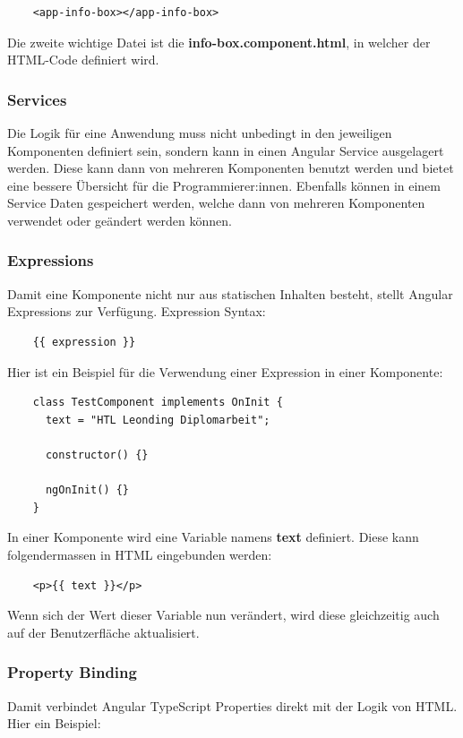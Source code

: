 \begin{lstlisting}
    <app-info-box></app-info-box>
\end{lstlisting}

Die zweite wichtige Datei ist die \textbf{info-box.component.html}, in welcher der HTML-Code definiert wird.

\subsubsection{Services}
Die Logik für eine Anwendung muss nicht unbedingt in den jeweiligen Komponenten definiert sein, sondern kann in einen Angular Service ausgelagert werden. Diese kann dann von mehreren Komponenten benutzt werden und bietet eine bessere Übersicht für die Programmierer:innen.
Ebenfalls können in einem Service Daten gespeichert werden, welche dann von mehreren Komponenten verwendet oder geändert werden können.

\subsubsection{Expressions}
Damit eine Komponente nicht nur aus statischen Inhalten besteht, stellt Angular Expressions zur Verfügung.
Expression Syntax:

\begin{lstlisting}
    {{ expression }}
\end{lstlisting}

Hier ist ein Beispiel für die Verwendung einer Expression in einer Komponente:

\begin{lstlisting}
    class TestComponent implements OnInit {
      text = "HTL Leonding Diplomarbeit";
    
      constructor() {}
    
      ngOnInit() {}
    }
\end{lstlisting}

In einer Komponente wird eine Variable namens \textbf{text} definiert. Diese kann folgendermassen in HTML eingebunden werden:

\begin{lstlisting}
    <p>{{ text }}</p>
\end{lstlisting}

Wenn sich der Wert dieser Variable nun verändert, wird diese gleichzeitig auch auf der Benutzerfläche aktualisiert. 

\subsubsection{Property Binding}
Damit verbindet Angular TypeScript Properties direkt mit der Logik von HTML. Hier ein Beispiel:

